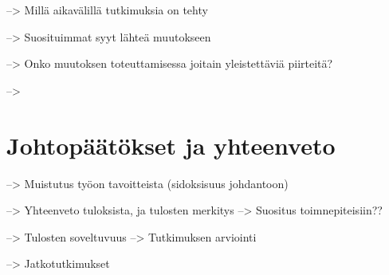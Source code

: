 --> Millä aikavälillä tutkimuksia on tehty

--> Suosituimmat syyt lähteä muutokseen

--> Onko muutoksen toteuttamisessa joitain yleistettäviä piirteitä?

--> 


\section{Johtopäätökset ja yhteenveto}
\label{sec:johtopaatokset}

--> Muistutus työon tavoitteista (sidoksisuus johdantoon)

--> Yhteenveto tuloksista, ja tulosten merkitys
--> Suositus toimnepiteisiin??

--> Tulosten soveltuvuus
--> Tutkimuksen arviointi

--> Jatkotutkimukset


